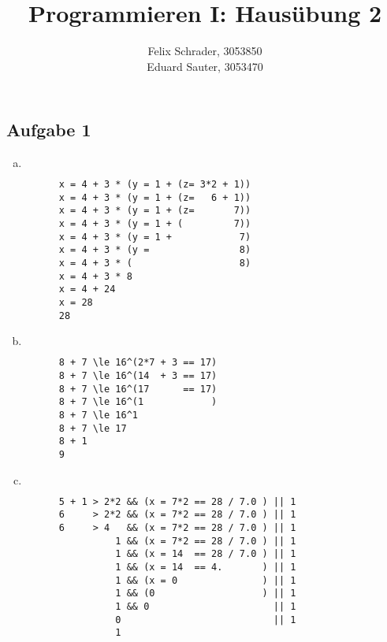 \documentclass[11pt]{article}
\author{Felix Schrader, 3053850 \\
      Eduard Sauter, 3053470 }
\title{Programmieren I: Haus\"ubung 2}
\begin{document}
\maketitle
\subsection*{Aufgabe 1}
\begin{enumerate}[a)]
  \item $ $ %
    \begin{lstlisting}
      x = 4 + 3 * (y = 1 + (z= 3*2 + 1))
      x = 4 + 3 * (y = 1 + (z=   6 + 1))
      x = 4 + 3 * (y = 1 + (z=       7))
      x = 4 + 3 * (y = 1 + (         7))
      x = 4 + 3 * (y = 1 +            7)
      x = 4 + 3 * (y =                8)
      x = 4 + 3 * (                   8)
      x = 4 + 3 * 8
      x = 4 + 24                         
      x = 28                            
      28                            
    \end{lstlisting}
  \item $ $
    \begin{lstlisting}
      8 + 7 \le 16^(2*7 + 3 == 17)
      8 + 7 \le 16^(14  + 3 == 17)
      8 + 7 \le 16^(17      == 17)
      8 + 7 \le 16^(1            )
      8 + 7 \le 16^1              
      8 + 7 \le 17                
      8 + 1
      9
    \end{lstlisting}
  \item $ $
    \begin{lstlisting}
      5 + 1 > 2*2 && (x = 7*2 == 28 / 7.0 ) || 1
      6     > 2*2 && (x = 7*2 == 28 / 7.0 ) || 1
      6     > 4   && (x = 7*2 == 28 / 7.0 ) || 1
                1 && (x = 7*2 == 28 / 7.0 ) || 1
                1 && (x = 14  == 28 / 7.0 ) || 1
                1 && (x = 14  == 4.       ) || 1
                1 && (x = 0               ) || 1
                1 && (0                   ) || 1
                1 && 0                      || 1
                0                           || 1
                1
    \end{lstlisting}
  
  
\end{enumerate} 
\end{document}
